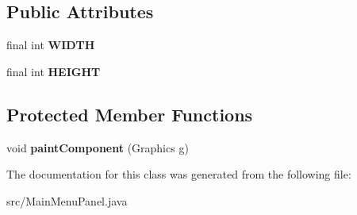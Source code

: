 \subsection*{Public Attributes}
\begin{DoxyCompactItemize}
\item 
final int {\bfseries W\+I\+D\+TH}\hypertarget{classMainMenuPanel_a40a16a0906506f77e058246871edb7aa}{}\label{classMainMenuPanel_a40a16a0906506f77e058246871edb7aa}

\item 
final int {\bfseries H\+E\+I\+G\+HT}\hypertarget{classMainMenuPanel_a16cccb47e75566ec2d0a619390ce791a}{}\label{classMainMenuPanel_a16cccb47e75566ec2d0a619390ce791a}

\end{DoxyCompactItemize}
\subsection*{Protected Member Functions}
\begin{DoxyCompactItemize}
\item 
void {\bfseries paint\+Component} (Graphics g)\hypertarget{classMainMenuPanel_a912f66021f4771dfb4bac2150c18ffc6}{}\label{classMainMenuPanel_a912f66021f4771dfb4bac2150c18ffc6}

\end{DoxyCompactItemize}


The documentation for this class was generated from the following file\+:\begin{DoxyCompactItemize}
\item 
src/Main\+Menu\+Panel.\+java\end{DoxyCompactItemize}
